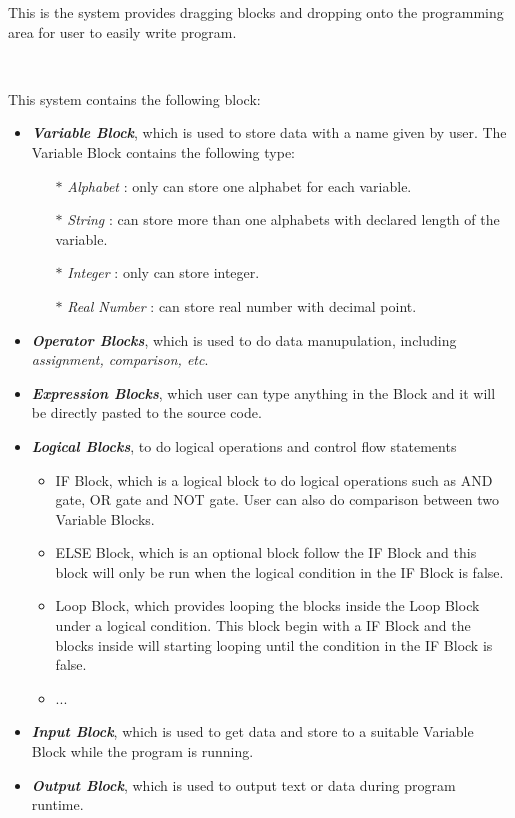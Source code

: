 This is the system provides dragging blocks and dropping onto the programming area for user to easily write program.\par~

This system contains the following block:
  \begin{itemize}
	\item \textit{\textbf{Variable Block}}, which is used to store data with a name given by user. The Variable Block contains the following type:
		\begin{itemize}
		\item[$\ast$] \textit{Alphabet} : only can store one alphabet for each variable.
		\item[$\ast$] \textit{String} : can store more than one alphabets with declared length of the variable.
		\item[$\ast$] \textit{Integer} : only can store integer.
		\item[$\ast$] \textit{Real Number} : can store real number with decimal point.
    \end{itemize}
	\item \textbf{\textit{Operator Blocks}}, which is used to do data manupulation, including \textit{assignment, comparison, etc}.
	\item \textit{\textbf{Expression Blocks}}, which user can type anything in the Block and it will be directly pasted to the source code.
	\item \textbf{\textit{Logical Blocks}}, to do logical operations and control flow statements
	\begin{itemize}
		\item IF Block, which is a logical block to do logical operations such as AND gate, OR gate and NOT gate. User can also do comparison between two Variable Blocks.
		\item ELSE Block, which is an optional block follow the IF Block and this block will only be run when the logical condition in the IF Block is false.
		\item Loop Block, which provides looping the blocks inside the Loop Block under a logical condition. This block begin with a IF Block and the blocks inside will starting looping until the condition in the IF Block is false.
		\item ...
	\end{itemize}
	\item \textit{\textbf{Input Block}}, which is used to get data and store to a suitable Variable Block while the program is running.
	\item \textit{\textbf{Output Block}}, which is used to output text or data during program runtime.

\end{itemize}
